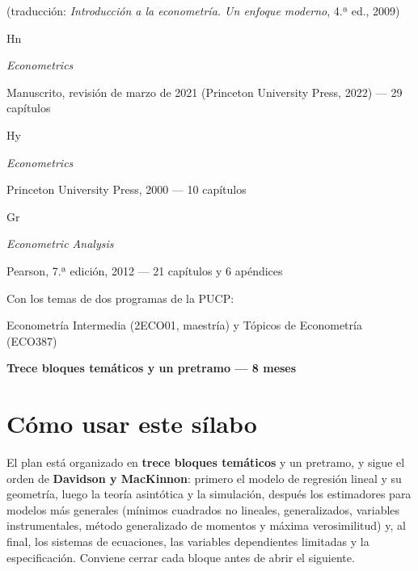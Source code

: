 \documentclass[11pt,a4paper]{article}
\newcommand{\etiqueta}[2]{%
  {\setlength{\fboxsep}{1.4pt}\colorbox{#1}{\sffamily\bfseries\color{white}\strut#2}}}
\begin{document}
\begin{titlepage}
{\small\color{tonoPizarra} (traducción: \emph{Introducción a la econometría. Un enfoque moderno}, 4.ª ed., 2009)\par}
\vspace{0.3cm}
{\large\etiqueta{colorHn}{Hn} \par}
{\normalsize \emph{\color{colorHn}Econometrics}\par}
{\small\color{tonoPizarra} Manuscrito, revisión de marzo de 2021 (Princeton University Press, 2022) --- 29 capítulos\par}
\vspace{0.3cm}
{\large\etiqueta{colorHy}{Hy} \par}
{\normalsize \emph{\color{colorHy}Econometrics}\par}
{\small\color{tonoPizarra} Princeton University Press, 2000 --- 10 capítulos\par}
\vspace{0.3cm}
{\large\etiqueta{colorGr}{Gr} \par}
{\normalsize \emph{\color{colorGr}Econometric Analysis}\par}
{\small\color{tonoPizarra} Pearson, 7.ª edición, 2012 --- 21 capítulos y 6 apéndices\par}
\vspace{0.7cm}
{\normalsize\color{colorPUCP} Con los temas de dos programas de la PUCP:\par}
{\normalsize\color{colorPUCP} Econometría Intermedia (2ECO01, maestría) y Tópicos de Econometría (ECO387)\par}
\vfill
{\setlength{\fboxsep}{6pt}\colorbox{tonoPrincipal}{\normalsize\sffamily\bfseries\color{white} Trece bloques temáticos y un pretramo --- 8 meses}\par}
\vspace{0.2cm}
\end{titlepage}

\tableofcontents
\newpage

\section*{Cómo usar este sílabo}

El plan está organizado en \textbf{trece bloques temáticos} y un pretramo, y
sigue el orden de \textcolor{colorDM}{\textbf{Davidson y MacKinnon}}: primero el
modelo de regresión lineal y su geometría, luego la teoría asintótica y la
simulación, después los estimadores para modelos más generales (mínimos
cuadrados no lineales, generalizados, variables instrumentales, método
generalizado de momentos y máxima verosimilitud) y, al final, los sistemas de
ecuaciones, las variables dependientes limitadas y la especificación. Conviene
cerrar cada bloque antes de abrir el siguiente.
\end{document}

